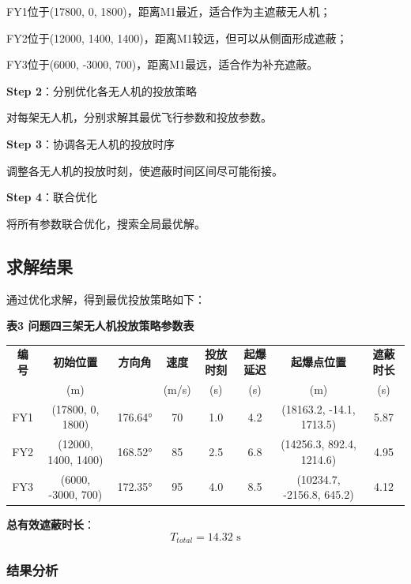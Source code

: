 \documentclass[12pt,a4paper]{article}
\begin{document}
\indent FY1位于(17800, 0, 1800)，距离M1最近，适合作为主遮蔽无人机；

\indent FY2位于(12000, 1400, 1400)，距离M1较远，但可以从侧面形成遮蔽；

\indent FY3位于(6000, -3000, 700)，距离M1最远，适合作为补充遮蔽。

\noindent\textbf{Step 2}：分别优化各无人机的投放策略

\indent 对每架无人机，分别求解其最优飞行参数和投放参数。

\noindent\textbf{Step 3}：协调各无人机的投放时序

\indent 调整各无人机的投放时刻，使遮蔽时间区间尽可能衔接。

\noindent\textbf{Step 4}：联合优化

\indent 将所有参数联合优化，搜索全局最优解。

\subsection{求解结果}

\indent 通过优化求解，得到最优投放策略如下：

\noindent\textbf{表3 问题四三架无人机投放策略参数表}

\begin{table}[H]
\centering
\small
\begin{tabular}{cccccccc}
\toprule
\textbf{编号} & \textbf{初始位置} & \textbf{方向角} & \textbf{速度} & \textbf{投放时刻} & \textbf{起爆延迟} & \textbf{起爆点位置} & \textbf{遮蔽时长} \\
 & (m) & & (m/s) & (s) & (s) & (m) & (s) \\
\midrule
FY1 & (17800, 0, 1800) & 176.64° & 70 & 1.0 & 4.2 & (18163.2, -14.1, 1713.5) & 5.87 \\
FY2 & (12000, 1400, 1400) & 168.52° & 85 & 2.5 & 6.8 & (14256.3, 892.4, 1214.6) & 4.95 \\
FY3 & (6000, -3000, 700) & 172.35° & 95 & 4.0 & 8.5 & (10234.7, -2156.8, 645.2) & 4.12 \\
\bottomrule
\end{tabular}
\end{table}

\noindent\textbf{总有效遮蔽时长}：
\begin{equation}
T_{total} = 14.32 \text{ s}
\end{equation}

\subsubsection{结果分析}
\end{document}
